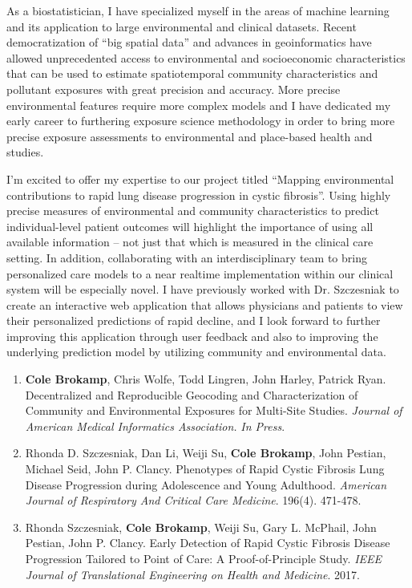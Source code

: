 \documentclass{nihbiosketch}
\begin{document}
\begin{statement}

As a biostatistician, I have specialized myself in the areas of machine learning and its application to large environmental and clinical datasets.  Recent democratization of “big spatial data” and advances in geoinformatics have allowed unprecedented access to environmental and socioeconomic characteristics that can be used to estimate spatiotemporal community characteristics and pollutant exposures with great precision and accuracy. More precise environmental features require more complex models and I have dedicated my early career to furthering exposure science methodology in order to bring more precise exposure assessments to environmental and place-based health and studies.  

I'm excited to offer my expertise to our project titled ``Mapping environmental contributions to rapid lung disease progression in cystic fibrosis''. Using highly precise measures of environmental and community characteristics to predict individual-level patient outcomes will highlight the importance of using all available information -- not just that which is measured in the clinical care setting.  In addition, collaborating with an interdisciplinary team to bring personalized care models to a near realtime implementation within our clinical system will be especially novel. I have previously worked with Dr. Szczesniak to create an interactive web application that allows physicians and patients to view their personalized predictions of rapid decline, and I look forward to further improving this application through user feedback and also to improving the underlying prediction model by utilizing community and environmental data.

\begin{enumerate}

	\item \textbf{Cole Brokamp}, Chris Wolfe, Todd Lingren, John Harley, Patrick Ryan. Decentralized and Reproducible Geocoding and Characterization of Community and Environmental Exposures for Multi-Site Studies. \emph{Journal of American Medical Informatics Association.} \emph{In Press}.
	
	\item Rhonda D. Szczesniak, Dan Li, Weiji Su, \textbf{Cole Brokamp}, John Pestian, Michael Seid, John P. Clancy. Phenotypes of Rapid Cystic Fibrosis Lung Disease Progression during Adolescence and Young Adulthood. \emph{American Journal of Respiratory And Critical Care Medicine}. 196(4). 471-478.
	
	\item Rhonda Szczesniak, \textbf{Cole Brokamp}, Weiji Su, Gary L. McPhail,
	John Pestian, John P. Clancy. Early Detection of Rapid Cystic Fibrosis
	Disease Progression Tailored to Point of Care: A Proof-of-Principle
	Study. \emph{IEEE Journal of Translational Engineering on Health and Medicine}. 2017.

\end{enumerate}

\end{statement}
\end{document}
